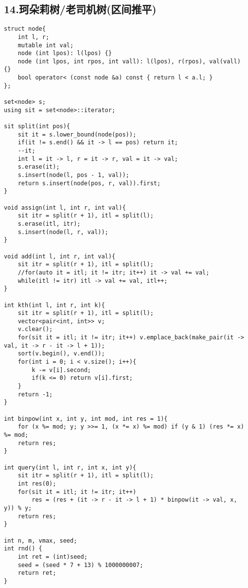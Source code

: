 \documentclass[]{article}
\begin{document}
\hypertarget{ux73c2ux6735ux8389ux6811ux8001ux53f8ux673aux6811ux533aux95f4ux63a8ux5e73}{%
\subsection{14.珂朵莉树/老司机树(区间推平)}\label{ux73c2ux6735ux8389ux6811ux8001ux53f8ux673aux6811ux533aux95f4ux63a8ux5e73}}

\begin{verbatim}
struct node{
    int l, r;
    mutable int val;
    node (int lpos): l(lpos) {}
    node (int lpos, int rpos, int vall): l(lpos), r(rpos), val(vall) {}
    bool operator< (const node &a) const { return l < a.l; }
};

set<node> s;
using sit = set<node>::iterator;

sit split(int pos){
    sit it = s.lower_bound(node(pos));
    if(it != s.end() && it -> l == pos) return it;
    --it;
    int l = it -> l, r = it -> r, val = it -> val;
    s.erase(it);
    s.insert(node(l, pos - 1, val));
    return s.insert(node(pos, r, val)).first;
}

void assign(int l, int r, int val){
    sit itr = split(r + 1), itl = split(l);
    s.erase(itl, itr);
    s.insert(node(l, r, val));
}

void add(int l, int r, int val){
    sit itr = split(r + 1), itl = split(l);
    //for(auto it = itl; it != itr; it++) it -> val += val;
    while(itl != itr) itl -> val += val, itl++;
}

int kth(int l, int r, int k){
    sit itr = split(r + 1), itl = split(l);
    vector<pair<int, int>> v;
    v.clear();
    for(sit it = itl; it != itr; it++) v.emplace_back(make_pair(it -> val, it -> r - it -> l + 1));
    sort(v.begin(), v.end());
    for(int i = 0; i < v.size(); i++){
        k -= v[i].second;
        if(k <= 0) return v[i].first;
    }
    return -1;
}

int binpow(int x, int y, int mod, int res = 1){
    for (x %= mod; y; y >>= 1, (x *= x) %= mod) if (y & 1) (res *= x) %= mod;
    return res;
}

int query(int l, int r, int x, int y){
    sit itr = split(r + 1), itl = split(l);
    int res(0);
    for(sit it = itl; it != itr; it++)
        res = (res + (it -> r - it -> l + 1) * binpow(it -> val, x, y)) % y;
    return res;
}

int n, m, vmax, seed;
int rnd() {
    int ret = (int)seed;
    seed = (seed * 7 + 13) % 1000000007;
    return ret;
}


\end{verbatim}
\end{document}
